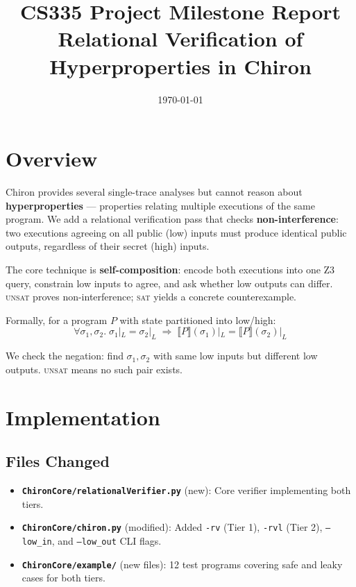 \documentclass[11pt,a4paper]{article}
\title{
  \Large\textbf{CS335 Project Milestone Report}\\[0.4em]
  \large Relational Verification of Hyperproperties in Chiron
}
\author{}
\date{\today}
\begin{document}
\maketitle
\thispagestyle{fancy}

\section{Overview}

Chiron provides several single-trace analyses but cannot reason about
\textbf{hyperproperties} — properties relating multiple executions of the same
program. We add a relational verification pass that checks
\textbf{non-interference}: two executions agreeing on all public (low) inputs
must produce identical public outputs, regardless of their secret (high) inputs.

The core technique is \textbf{self-composition}: encode both executions into one
Z3 query, constrain low inputs to agree, and ask whether low outputs can differ.
\textsc{unsat} proves non-interference; \textsc{sat} yields a concrete
counterexample.

Formally, for a program $P$ with state partitioned into low/high:
\[
  \forall \sigma_1, \sigma_2.\;
  \sigma_1|_{L} = \sigma_2|_{L}
  \;\Rightarrow\;
  \llbracket P \rrbracket(\sigma_1)|_{L} = \llbracket P \rrbracket(\sigma_2)|_{L}
\]

We check the negation: find $\sigma_1, \sigma_2$ with same low inputs but
different low outputs. \textsc{unsat} means no such pair exists.

\section{Implementation}

\subsection{Files Changed}

\begin{itemize}[noitemsep]
  \item \textbf{\texttt{ChironCore/relationalVerifier.py}} (new): Core verifier
  implementing both tiers.
  \item \textbf{\texttt{ChironCore/chiron.py}} (modified): Added \texttt{-rv}
  (Tier 1), \texttt{-rvl} (Tier 2), \texttt{--low\_in}, and \texttt{--low\_out}
  CLI flags.
  \item \textbf{\texttt{ChironCore/example/}} (new files): 12 test programs
  covering safe and leaky cases for both tiers.
\end{itemize}
\end{document}
